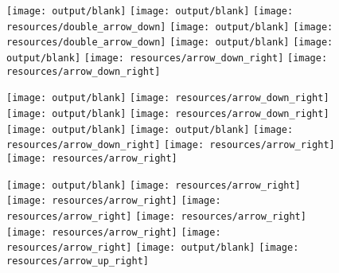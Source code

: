 \documentclass[11pt]{article}
\newcommand{\backgroundimage}{celltypes_horizontal.pdf} %
\begin{document}


\begin{figure}[htbp]
  \centering
  \begin{minipage}[t]{0.125\textwidth} %
    \centering
    \vspace{-0.3871\linewidth} %
    \texttt{[image: output/blank]}
    \texttt{[image: output/blank]}
    \texttt{[image: resources/double\_arrow\_down]}
    \texttt{[image: output/blank]}
    \texttt{[image: resources/double\_arrow\_down]}
    \texttt{[image: output/blank]}
    \texttt{[image: output/blank]}
    \texttt{[image: resources/arrow\_down\_right]}
    \texttt{[image: resources/arrow\_down\_right]}


  \end{minipage}%
  \begin{minipage}[t]{0.125\textwidth} %
    \centering
    \texttt{[image: output/blank]}
    \texttt{[image: resources/arrow\_down\_right]}
    \texttt{[image: output/blank]}
    \texttt{[image: resources/arrow\_down\_right]}
    \texttt{[image: output/blank]}
    \texttt{[image: output/blank]}
    \texttt{[image: resources/arrow\_down\_right]}
    \texttt{[image: resources/arrow\_right]}
    \texttt{[image: resources/arrow\_right]}
  \end{minipage}%
  \begin{minipage}[t]{0.125\textwidth} %
    \centering
    \vspace{-0.3871\linewidth} %
    \texttt{[image: output/blank]}
    \texttt{[image: resources/arrow\_right]}
    \texttt{[image: resources/arrow\_right]}
    \texttt{[image: resources/arrow\_right]}
    \texttt{[image: resources/arrow\_right]}
    \texttt{[image: resources/arrow\_right]}
    \texttt{[image: resources/arrow\_right]}
    \texttt{[image: output/blank]}
    \texttt{[image: resources/arrow\_up\_right]}


\end{minipage}
\end{figure}
\end{document}
